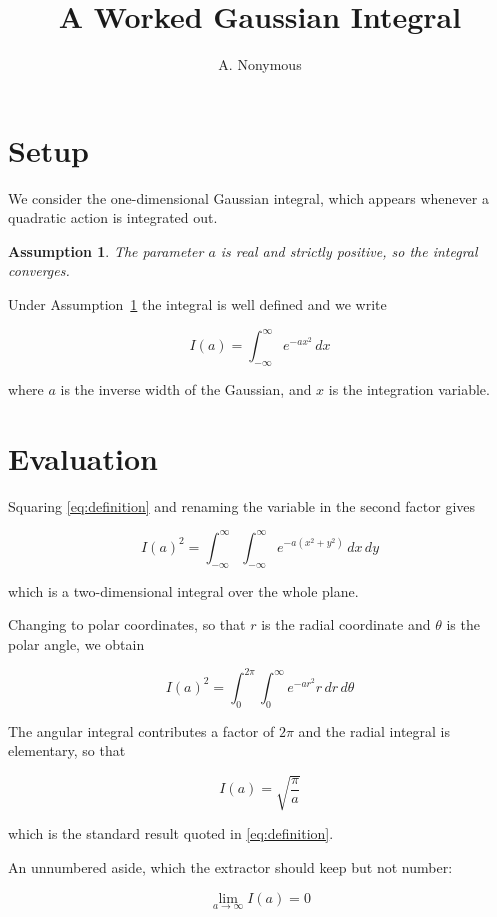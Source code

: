 \documentclass{article}
\title{A Worked Gaussian Integral}
\author{A. Nonymous}
\newtheorem{assumption}{Assumption}
\begin{document}
\maketitle

\section{Setup}

We consider the one-dimensional Gaussian integral, which appears whenever a quadratic
action is integrated out.

\begin{assumption}\label{as:positive}
The parameter $a$ is real and strictly positive, so the integral converges.
\end{assumption}

Under Assumption~\ref{as:positive} the integral is well defined and we write

\begin{equation}\label{eq:definition}\tag{1}
I(a) = \int_{-\infty}^{\infty} e^{-a x^{2}}\,dx
\end{equation}

where $a$ is the inverse width of the Gaussian, and $x$ is the integration variable.

\section{Evaluation}

Squaring \eqref{eq:definition} and renaming the variable in the second factor gives

\begin{equation}\label{eq:squared}\tag{2}
I(a)^{2} = \int_{-\infty}^{\infty}\int_{-\infty}^{\infty} e^{-a(x^{2}+y^{2})}\,dx\,dy
\end{equation}

which is a two-dimensional integral over the whole plane.

Changing to polar coordinates, so that $r$ is the radial coordinate and $\theta$ is the
polar angle, we obtain

\begin{equation}\label{eq:polar}\tag{3}
I(a)^{2} = \int_{0}^{2\pi}\int_{0}^{\infty} e^{-a r^{2}} r\,dr\,d\theta
\end{equation}

The angular integral contributes a factor of $2\pi$ and the radial integral is elementary,
so that

\begin{equation}\label{eq:result}\tag{4}
I(a) = \sqrt{\frac{\pi}{a}}
\end{equation}

which is the standard result quoted in \eqref{eq:definition}.

An unnumbered aside, which the extractor should keep but not number:

\begin{equation*}
\lim_{a \to \infty} I(a) = 0
\end{equation*}
\end{document}

